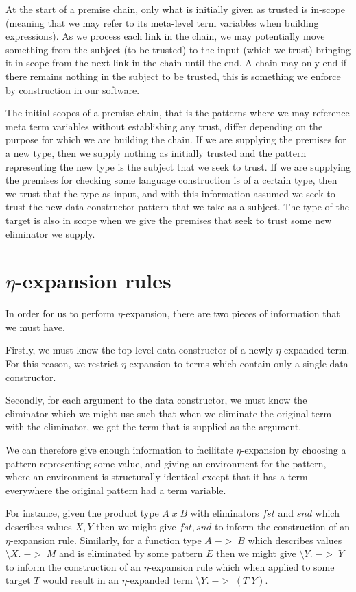 At the start of a premise chain, only what is initially given as
trusted is in-scope (meaning that we may refer to its meta-level term
variables when building expressions). As we process each link in the
chain, we may potentially move something from the subject (to be
trusted) to the input (which we trust) bringing it in-scope from the
next link in the chain until the end. A chain may only end if there
remains nothing in the subject to be trusted, this is something we
enforce by construction in our software.

The initial scopes of a premise chain, that is the patterns where we
may reference meta term variables without establishing any trust,
differ depending on the purpose for which we are building the
chain. If we are supplying the premises for a new type, then we supply
nothing as initially trusted and the pattern representing the new type
is the subject that we seek to trust. If we are supplying the premises
for checking some language construction is of a certain type, then we
trust that the type as input, and with this information assumed we
seek to trust the new data constructor pattern that we take as a
subject. The type of the target is also in scope when we give the
premises that seek to trust some new eliminator we supply.

\section{$\eta$-expansion rules}
\label{DSL-eta-rules}

In order for us to perform $\eta$-expansion, there are two pieces of
information that we must have.

Firstly, we must know the top-level data constructor of a newly
$\eta$-expanded term. For this reason, we restrict $\eta$-expansion to
terms which contain only a single data constructor.

Secondly, for each argument to the data constructor, we must know the
eliminator which we might use such that when we eliminate the original
term with the eliminator, we get the term that is supplied as the
argument.

We can therefore give enough information to facilitate
$\eta$-expansion by choosing a pattern representing some value, and
giving an environment for the pattern, where an environment is
structurally identical except that it has a term everywhere the
original pattern had a term variable.

For instance, given the product type $A \; x \; B$ with eliminators
$fst$ and $snd$ which describes values $X , Y$ then we might give $fst
, snd$ to inform the construction of an $\eta$-expansion rule. Similarly,
for a function type $A \; -> \; B$ which describes values $\setminus
X. \; -> \; M$ and is eliminated by some pattern $E$ then we might
give $\setminus Y. \; -> \; Y$ to inform the construction of an
$\eta$-expansion rule which when applied to some target $T$ would
result in an $\eta$-expanded term $\setminus Y. \; -> \; (T \; Y)$.

